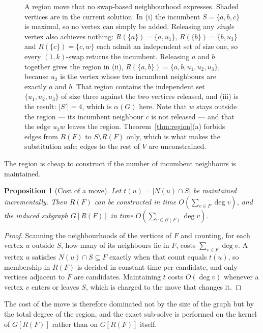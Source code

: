 \documentclass[preprint,12pt]{elsarticle}
\newtheorem{proposition}[theorem]{Proposition}
\theoremstyle{definition}
\begin{document}
\begin{figure}[htbp]
\centering
\resizebox{\textwidth}{!}{}
\caption{A region move that no swap-based neighbourhood expresses. Shaded
vertices are in the current solution. In (i) the incumbent $S=\{a,b,c\}$ is
maximal, so no vertex can simply be added. Releasing any \emph{single} vertex
also achieves nothing: $R(\{a\})=\{a,u_1\}$, $R(\{b\})=\{b,u_3\}$ and
$R(\{c\})=\{c,w\}$ each admit an independent set of size one, so every
$(1,k)$-swap returns the incumbent. Releasing $a$ and $b$ together gives the
region in (ii), $R(\{a,b\})=\{a,b,u_1,u_2,u_3\}$, because $u_2$ is the vertex
whose two incumbent neighbours are exactly $a$ and $b$. That region contains the
independent set $\{u_1,u_2,u_3\}$ of size three against the two vertices
released, and (iii) is the result: $|S'|=4$, which is $\alpha(G)$ here. Note that
$w$ stays outside the region --- its incumbent neighbour $c$ is not released ---
and that the edge $u_3w$ leaves the region. Theorem~\ref{thm:region}(a) forbids
edges from $R(F)$ to $S \setminus R(F)$ only, which is what makes the
substitution safe; edges to the rest of $V$ are unconstrained.}
\label{fig:region}
\end{figure}

The region is cheap to construct if the number of incumbent neighbours is
maintained.

\begin{proposition}[Cost of a move]
\label{prop:cost}
Let $t(u) = |N(u) \cap S|$ be maintained incrementally. Then $R(F)$ can be
constructed in time $O\!\left(\sum_{v \in F} \deg v\right)$, and the induced
subgraph $G[R(F)]$ in time $O\!\left(\sum_{v \in R(F)} \deg v\right)$.
\end{proposition}

\begin{proof}
Scanning the neighbourhoods of the vertices of $F$ and counting, for each
vertex $u$ outside $S$, how many of its neighbours lie in $F$, costs
$\sum_{v \in F} \deg v$. A vertex $u$ satisfies $N(u) \cap S \subseteq F$
exactly when that count equals $t(u)$, so membership in $R(F)$ is decided in
constant time per candidate, and only vertices adjacent to $F$ are candidates.
Maintaining $t$ costs $O(\deg v)$ whenever a vertex $v$ enters or leaves $S$,
which is charged to the move that changes it.
\end{proof}

The cost of the move is therefore dominated not by the size of the graph but by
the total degree of the region, and the exact sub-solve is performed on the
kernel of $G[R(F)]$ rather than on $G[R(F)]$ itself.
\end{document}
